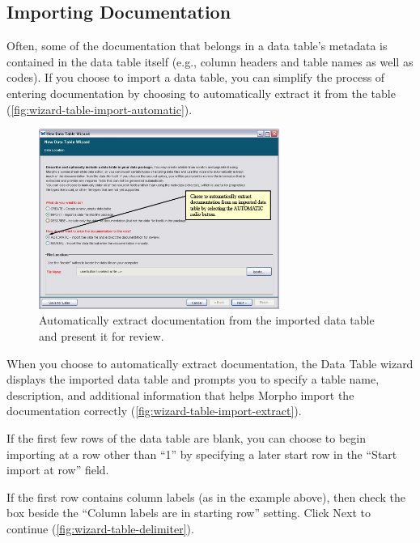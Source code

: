 \subsection{Importing Documentation}
\label{sec:table-importing-documentation}

Often, some of the documentation that belongs in a data table's metadata
is contained in the data table itself (e.g., column headers and table
names as well as codes). If you choose to import a data table, you can
simplify the process of entering documentation by choosing to
automatically extract it from the table
(\autoref{fig:wizard-table-import-automatic}).

\begin{figure}
  \centering
    \includegraphics[width=0.7\textwidth]{images/wizard-table-import-automatic.jpg}
  \caption{Automatically extract documentation from the imported data
    table and present it for review.}
  \label{fig:wizard-table-import-automatic}
\end{figure}

When you choose to automatically extract documentation, the Data Table
wizard displays the imported data table and prompts you to specify a
table name, description, and additional information that helps Morpho
import the documentation correctly
(\autoref{fig:wizard-table-import-extract}). 

If the first few rows of the data table are blank, you can choose to
begin importing at a row other than ``1'' by specifying a later start
row in the ``Start import at row'' field.

If the first row contains column labels (as in the example above), then
check the box beside the ``Column labels are in starting row'' setting.
Click Next to continue (\autoref{fig:wizard-table-delimiter}).

